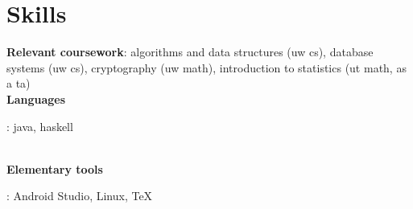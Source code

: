 \documentclass[letterpaper,11pt]{article}
\newcommand\commenttt[1]{}
\begin{document}
\section{Skills}
\begin{itemize}[leftmargin=0.15in, label={}]
    \normalsize{\item{
     \textbf{Relevant coursework}{: algorithms and data structures (uw cs), 
                                    database systems (uw cs), 
                                    cryptography (uw math), 
                                    introduction to statistics (ut math, as a ta) } \\
     \textbf{Languages}{: java, 
                          haskell
                          \commenttt{, SQL do a thing, maybe the mines thing?}
                          }\\
     \textbf{Elementary tools}{: Android Studio, 
                                 Linux, 
                                 \TeX
                                 \commenttt{, xml (read something)}
                                 \commenttt{, git }
                              }
    }}
 \end{itemize}
\end{document}
